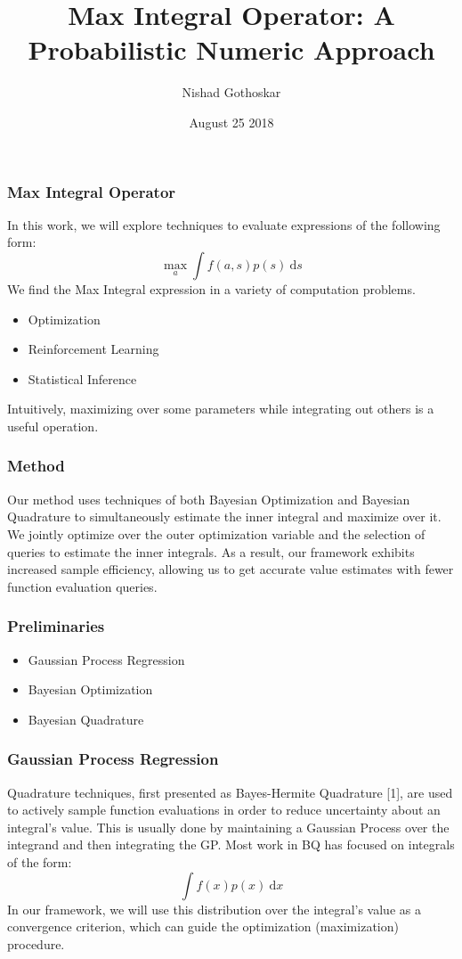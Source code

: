 \documentclass[9pt]{beamer}
\title{Max Integral Operator: A Probabilistic Numeric Approach}
\author{Nishad Gothoskar}
\institute{Learning and Intelligent Systems - MIT}
\date{August 25 2018}
\begin{document}
 
\frame{\titlepage}
 
\begin{frame}
\frametitle{Max Integral Operator}
In this work, we will explore techniques to evaluate expressions of the following form:
\begin{equation*}
    \max_{a} \int f(a,s) p(s) \ \text{d}s
\end{equation*}
\newline
We find the Max Integral expression in a variety of computation problems.
\begin{itemize}
	\item Optimization
	\item Reinforcement Learning
	\item Statistical Inference
\end{itemize}
\hfill \newline
Intuitively, maximizing over some parameters while integrating out others is a useful operation.
\end{frame}

\begin{frame}
\frametitle{Method}
Our method uses techniques of both Bayesian Optimization and Bayesian Quadrature to simultaneously estimate the inner integral and maximize over it. 
\newline \newline
We jointly optimize over the outer optimization variable and the selection of queries to estimate the inner integrals. As a result, our framework exhibits increased sample efficiency, allowing us to get accurate value estimates with fewer function evaluation queries.
\end{frame}

\begin{frame}
\frametitle{Preliminaries}
\begin{itemize}
	\item Gaussian Process Regression 
	\item Bayesian Optimization
	\item Bayesian Quadrature
\end{itemize}
\end{frame}

\begin{frame}
\frametitle{Gaussian Process Regression}
Quadrature techniques, first presented as Bayes-Hermite Quadrature [1], are used to actively sample function evaluations in order to reduce uncertainty about an integral's value. This is usually done by maintaining a Gaussian Process over the integrand and then integrating the GP. 
\newline\newline
Most work in BQ has focused on integrals of the form:
\begin{equation*}
   \int f(x) p(x)  \ \text{d}x
\end{equation*}
In our framework, we will use this distribution over the integral's value as a convergence criterion, which can guide the optimization (maximization) procedure.
\end{frame}
\end{document}
